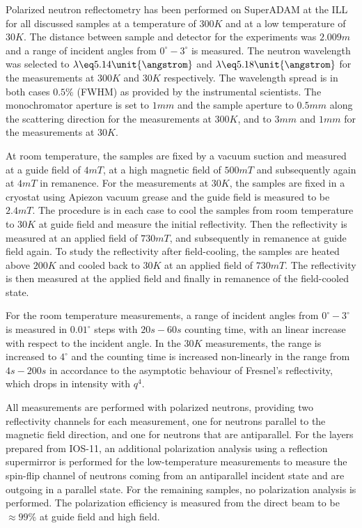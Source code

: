 \documentclass[\main/dresen_thesis.tex]{subfiles}
\begin{document}
    Polarized neutron reflectometry has been performed on SuperADAM at the ILL for all discussed samples at a temperature of $300 \unit{K}$ and at a low temperature of $30 \unit{K}$.
    The distance between sample and detector for the experiments was $2.009 \unit{m}$ and a range of incident angles from $0 ^\circ - 3 ^\circ$ is measured.
    The neutron wavelength was selected to $\lambda \eq 5.14 \unit{\angstrom}$ and $\lambda \eq 5.18 \unit{\angstrom}$ for the measurements at $300 \unit{K}$ and $30 \unit{K}$ respectively.
    The wavelength spread is in both cases $0.5 \%$ (FWHM) as provided by the instrumental scientists.
    The monochromator aperture is set to $1 \unit{mm}$ and the sample aperture to $0.5 \unit{mm}$ along the scattering direction for the measurements at $300 \unit{K}$, and to $3 \unit{mm}$ and $1 \unit{mm}$ for the measurements at $30 \unit{K}$.

    At room temperature, the samples are fixed by a vacuum suction and measured at a guide field of $4 \unit{mT}$, at a high magnetic field of $500 \unit{mT}$ and subsequently again at $4 \unit{mT}$ in remanence.
    For the measurements at $30 \unit{K}$, the samples are fixed in a cryostat using Apiezon vacuum grease and the guide field is measured to be $2.4 \unit{mT}$.
    The procedure is in each case to cool the samples from room temperature to $30 \unit{K}$ at guide field and measure the initial reflectivity.
    Then the reflectivity is measured at an applied field of $730 \unit{mT}$, and subsequently in remanence at guide field again.
    To study the reflectivity after field-cooling, the samples are heated above $200 \unit{K}$ and cooled back to $30 \unit{K}$ at an applied field of $730 \unit{mT}$.
    The reflectivity is then measured at the applied field and finally in remanence of the field-cooled state.

    For the room temperature measurements, a range of incident angles from $0^\circ - 3 ^\circ$ is measured in $0.01 ^\circ$ steps with $20 \unit{s} - 60 \unit{s}$ counting time, with an linear increase with respect to the incident angle.
    In the $30 \unit{K}$ measurements, the range is increased to $4 ^\circ$ and the counting time is increased non-linearly in the range from $4 \unit{s} - 200 \unit{s}$ in accordance to the asymptotic behaviour of Fresnel's reflectivity, which drops in intensity with $q^4$.

    All measurements are performed with polarized neutrons, providing two reflectivity channels for each measurement, one for neutrons parallel to the magnetic field direction, and one for neutrons that are antiparallel.
    For the layers prepared from IOS-11, an additional polarization analysis using a reflection supermirror is performed for the low-temperature measurements to measure the spin-flip channel of neutrons coming from an antiparallel incident state and are outgoing in a parallel state.
    For the remaining samples, no polarization analysis is performed.
    The polarization efficiency is measured from the direct beam to be $\approx 99 \%$ at guide field and high field.
\end{document}

